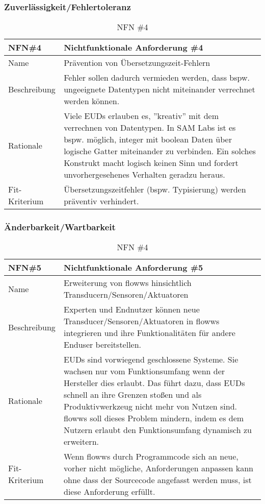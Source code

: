 \subsubsection{Zuverlässigkeit/Fehlertoleranz}
\begin{table}[H]
\caption{NFN \#4}
\label{tab:nfn4}
\begin{tabularx}{\textwidth}{lX}
\hline
\rowcolor[HTML]{EFEFEF} 
NFN\#4        & Nichtfunktionale Anforderung \#4 \\ \hline
Name          & Prävention von Übersetzungszeit-Fehlern \\ \hline
Beschreibung  & Fehler sollen dadurch vermieden werden, dass bspw. ungeeignete Datentypen nicht miteinander verrechnet werden können. \\ \hline
Rationale     & Viele EUDs erlauben es, ''kreativ'' mit dem verrechnen von Datentypen. In SAM Labs ist es bspw. möglich, integer mit boolean Daten  über logische Gatter miteinander zu verbinden. Ein solches Konstrukt macht logisch keinen Sinn und fordert unvorhergesehenes Verhalten geradzu heraus. \\ \hline
Fit-Kriterium & Übersetzungszeitfehler (bspw. Typisierung) werden präventiv verhindert.   \\ \hline
\end{tabularx}
\end{table}

\subsubsection{Änderbarkeit/Wartbarkeit}
\begin{table}[H]
\caption{NFN \#4}
\label{tab:nfn4}
\begin{tabularx}{\textwidth}{lX}
\hline
\rowcolor[HTML]{EFEFEF} 
NFN\#5        & Nichtfunktionale Anforderung \#5 \\ \hline
Name          & Erweiterung von flowws hinsichtlich Transducern/Sensoren/Aktuatoren \\ \hline
Beschreibung  & Experten und Endnutzer können neue Transducer/Sensoren/Aktuatoren in flowws integrieren und ihre Funktionalitäten für andere Enduser bereitstellen. \\ \hline
Rationale     & EUDs sind vorwiegend geschlossene Systeme. Sie wachsen nur vom Funktionsumfang wenn der Hersteller dies erlaubt. Das führt dazu, dass EUDs schnell an ihre Grenzen stoßen und als Produktivwerkzeug nicht mehr von Nutzen sind. flowws soll dieses Problem mindern, indem es dem Nutzern erlaubt den Funktionsumfang dynamisch zu erweitern. \\ \hline
Fit-Kriterium & Wenn flowws durch Programmcode sich an neue, vorher nicht mögliche, Anforderungen anpassen kann ohne dass der Sourcecode angefasst werden muss, ist diese Anforderung erfüllt. \\ \hline
\end{tabularx}
\end{table}
